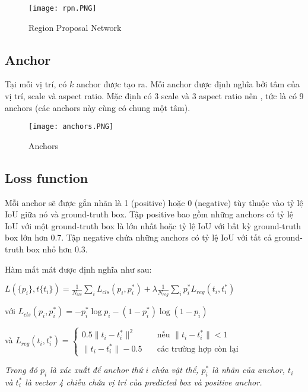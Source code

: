 \documentclass[../thesis.tex]{subfiles}
\begin{document}
\begin{figure}[H]
	\centering
	\texttt{[image: rpn.PNG]}
	\caption{Region Proposal Network}\label{Fig:rpn}
\end{figure}

\subsection{Anchor}

Tại mỗi vị trí, có $k$ anchor được tạo ra. Mỗi anchor được định nghĩa bởi tâm của vị trí, scale và aspect ratio. Mặc định có 3 scale và 3 aspect ratio nên , tức là có 9 anchors (các anchors này cùng có chung một tâm).

\begin{figure}[H]
	\centering
	\texttt{[image: anchors.PNG]}
	\caption{Anchors}\label{Fig:anchors}
\end{figure}

\subsection{Loss function}

Mỗi anchor sẽ được gắn nhãn là 1 (positive) hoặc 0 (negative) tùy thuộc vào tỷ lệ IoU giữa nó và ground-truth box. Tập positive bao gồm những anchors có tỷ lệ IoU với một ground-truth box là lớn nhất hoặc tỷ lệ IoU với bất kỳ ground-truth box lớn hơn 0.7. Tập negative chứa những anchors có tỷ lệ IoU với tất cả ground-truth box nhỏ hơn 0.3.

Hàm mất mát được định nghĩa như sau: 

$L(\{p_i\}, t\{t_i\}) = \displaystyle\frac{1}{N_{cls}}\displaystyle\sum_{i}^{} L_{cls}(p_i, p_i^*)+\lambda\displaystyle\frac{1}{N_{reg}}\displaystyle\sum_{i}^{}p_i^*L_{reg}(t_i,t_i^*)$

với $L_{cls}(p_i, p_i^*) = -p_i^*\log{p_i} - (1 - p_i^*)\log{(1-p_i)}$

và $L_{reg}(t_i,t_i^*) = 
\begin{cases}
    0.5\|t_i - t_i^*\|^2	& \quad \text{nếu }\|t_i - t_i^*\| < 1\\
    \|t_i - t_i^*\| - 0.5  	& \quad \text{các trường hợp còn lại}
\end{cases}
$

\textit{Trong đó $p_i$ là xác xuất để anchor thứ $i$ chứa vật thể, $p^*_i$ là nhãn của anchor, $t_i$ và $t^*_i$ là vector 4 chiều chứa vị trí của predicted box và positive anchor.}
\end{document}
